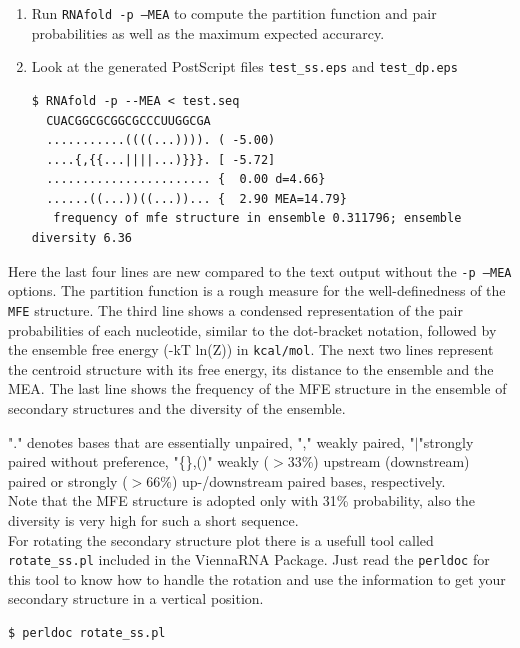 \documentclass[a4paper]{article}
\begin{document}
\begin{enumerate}\itemsep1pt
\item Run \texttt{RNAfold -p --MEA} to compute the partition function and
pair probabilities as well as the maximum expected accurarcy.
\item Look at the generated PostScript files \texttt{test\_ss.eps} and
\texttt{test\_dp.eps}
\begin{verbatim}
$ RNAfold -p --MEA < test.seq 
  CUACGGCGCGGCGCCCUUGGCGA
  ...........((((...)))). ( -5.00)
  ....{,{{...||||...)}}}. [ -5.72]
  ....................... {  0.00 d=4.66}
  ......((...))((...))... {  2.90 MEA=14.79}
   frequency of mfe structure in ensemble 0.311796; ensemble diversity 6.36  

\end{verbatim}
  \end{enumerate}
\noindent
Here the last four lines are new compared to the text output without the \texttt{-p --MEA} 
options. The partition function is a rough measure for the well-definedness of the \texttt{MFE} 
structure. The third line shows a condensed representation of the pair probabilities of each 
nucleotide, similar to the dot-bracket notation, followed by the ensemble free energy (-kT ln(Z)) in 
\texttt{kcal/mol}. The next two lines represent the centroid structure with its free energy, its 
distance to the ensemble and the MEA. The last line shows the frequency of the MFE structure in 
the ensemble of secondary structures and the diversity of the 
ensemble.

"." denotes bases that are essentially unpaired, "," weakly paired, 
"$|$"strongly paired without preference, "\{\},()" weakly ($>$33\%) upstream (downstream) 
paired or strongly ($>$66\%) up-/downstream paired bases, respectively.\\

Note that the MFE structure is adopted only with 31\% probability, also the
diversity is very high for such a short sequence.\\

For rotating the secondary structure plot there is a usefull tool called
\texttt{rotate\_ss.pl} included in the ViennaRNA Package. Just read the 
\texttt{perldoc} for this tool to know how to handle the rotation and use
the information to get your secondary structure in a vertical position.
\begin{verbatim}
$ perldoc rotate_ss.pl
\end{verbatim}%
\end{document}
